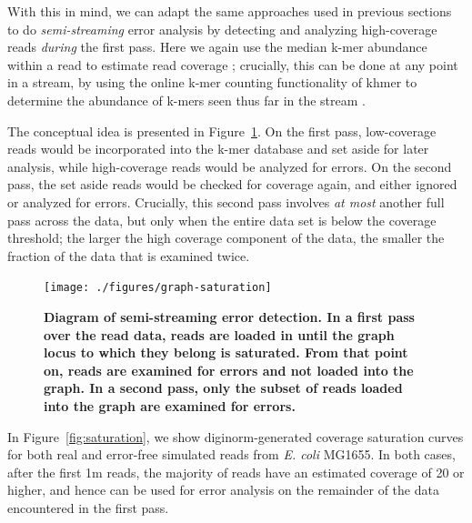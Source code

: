 \documentclass{article}
\begin{document}
With this in mind, we can adapt the same approaches used in previous
sections to do {\em semi-streaming} error analysis by detecting and
analyzing high-coverage reads {\em during} the first pass.  Here we
again use the median k-mer abundance within a read to estimate read
coverage \cite{Brown2012}; crucially, this can be done at any point in
a stream, by using the online k-mer counting functionality of khmer to
determine the abundance of k-mers seen thus far in the stream
\cite{Zhang2014}.

The conceptual idea is presented in Figure~\ref{fig:concept}.  On the
first pass, low-coverage reads would be incorporated into the k-mer
database and set aside for later analysis, while high-coverage reads
would be analyzed for errors. On the second pass, the set aside reads
would be checked for coverage again, and either ignored or analyzed
for errors.  Crucially, this second pass involves {\em at most}
another full pass across the data, but only when the entire data set
is below the coverage threshold; the larger the high coverage
component of the data, the smaller the fraction of the data that is
examined twice.

\begin{figure}[!ht]
 \centerline{\texttt{[image: ./figures/graph-saturation]}}
\caption{\bf Diagram of semi-streaming error detection. In a first pass
over the read data, reads are loaded in until the graph locus to which
they belong is saturated.  From that point on, reads are examined for
errors and not loaded into the graph.  In a second pass, only the subset
of reads loaded into the graph are examined for errors.}
\label{fig:concept}
\end{figure}

In Figure~\ref{fig:saturation}, we show diginorm-generated coverage
saturation curves for both real and error-free simulated reads from
{\em E. coli} MG1655.  In both cases, after the first 1m reads, the
majority of reads have an estimated coverage of 20 or higher, and
hence can be used for error analysis on the remainder of the data
encountered in the first pass.
\end{document}
